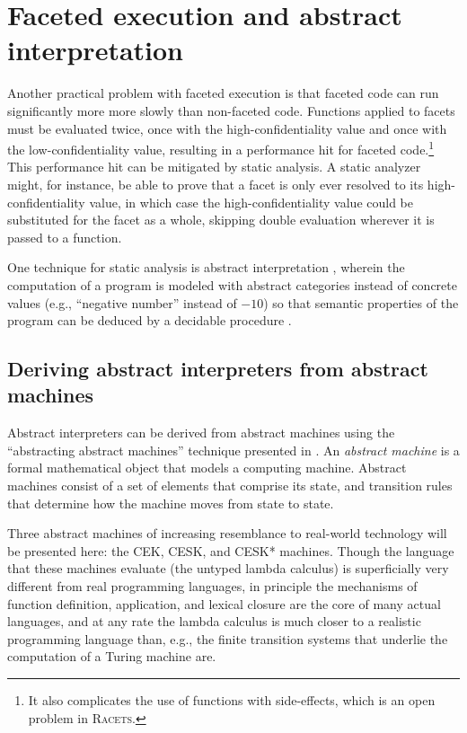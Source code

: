 \documentclass{article}
\begin{document}
\section{Faceted execution and abstract interpretation\label{sec:ai}}
Another practical problem with faceted execution is that faceted code can run significantly more more slowly than non-faceted code. Functions applied to facets must be evaluated twice, once with the high-confidentiality value and once with the low-confidentiality value, resulting in a performance hit for faceted code.\footnote{It also complicates the use of functions with side-effects, which is an open problem in \textsc{Racets}.} This performance hit can be mitigated by static analysis. A static analyzer might, for instance, be able to prove that a facet is only ever resolved to its high-confidentiality value, in which case the high-confidentiality value could be substituted for the facet as a whole, skipping double evaluation wherever it is passed to a function.

One technique for static analysis is abstract interpretation \cite{abstract-inter}, wherein the computation of a program is modeled with abstract categories instead of concrete values (e.g., ``negative number'' instead of $-10$) so that semantic properties of the program can be deduced by a decidable procedure \cite{ai-original}.


\subsection{Deriving abstract interpreters from abstract machines}
Abstract interpreters can be derived from abstract machines using the ``abstracting abstract machines'' technique presented in \cite{aam}. An \textit{abstract machine} is a formal mathematical object that models a computing machine. Abstract machines consist of a set of elements that comprise its state, and transition rules that determine how the machine moves from state to state.

Three abstract machines of increasing resemblance to real-world technology will be presented here: the CEK, CESK, and CESK* machines. Though the language that these machines evaluate (the untyped lambda calculus) is superficially very different from real programming languages, in principle the mechanisms of function definition, application, and lexical closure are the core of many actual languages, and at any rate the lambda calculus is much closer to a realistic programming language than, e.g., the finite transition systems that underlie the computation of a Turing machine are.
\end{document}
